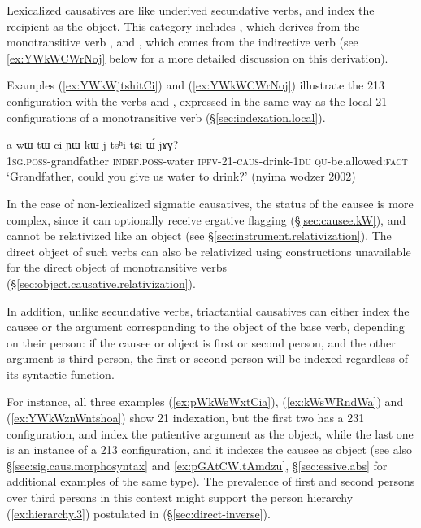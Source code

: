 Lexicalized causatives are like underived secundative verbs, and index the recipient as the object. This category includes , which derives from the monotransitive verb , and , which comes from the indirective verb  (see \ref{ex:YWkWCWrNoj} below for a more detailed discussion on this derivation). 

Examples (\ref{ex:YWkWjtshitCi}) and (\ref{ex:YWkWCWrNoj}) illustrate the 2\fl{}1\fl{}3 configuration with the verbs  and , expressed in the same way as the local 2\fl{}1 configurations of a monotransitive verb (§\ref{sec:indexation.local}).

\begin{exe}
	\ex \label{ex:YWkWjtshitCi}
	\gll a-wɯ tɯ-ci ɲɯ-kɯ-j-tsʰi-tɕi ɯ́-jɤɣ? \\
	\textsc{1sg}.\textsc{poss}-grandfather \textsc{indef}.\textsc{poss}-water \textsc{ipfv}-2\fl{}1-\textsc{caus}-drink-\textsc{1du} \textsc{qu}-be.allowed:\textsc{fact} \\
	\glt `Grandfather, could you give us water to drink?' (nyima wodzer 2002)
\end{exe}

In the case of non-lexicalized sigmatic causatives, the status of the causee is more complex, since it can optionally receive ergative flagging (§\ref{sec:causee.kW}), and cannot be relativized like an object (see §\ref{sec:instrument.relativization}). The direct object of such verbs can also be relativized using constructions unavailable for the direct object of monotransitive verbs (§\ref{sec:object.causative.relativization}).


In addition, unlike secundative verbs, triactantial causatives can either index the causee or the argument corresponding to the object of the base verb, depending on their person: if the causee or object is first or second person, and the other argument is third person, the first or second person will be indexed regardless of its syntactic function. 

For instance, all three examples (\ref{ex:pWkWsWxtCia}), (\ref{ex:kWsWRndWa}) and (\ref{ex:YWkWznWntshoa}) show 2\fl{}1 indexation, but the first two has a 2\fl{}3\fl{}1 configuration, and index the patientive argument as the object, while the last one is an instance of a 2\fl{}1\fl{}3 configuration, and it indexes the causee as object (see also §\ref{sec:sig.caus.morphosyntax} and \ref{ex:pGAtCW.tAmdzu}, §\ref{sec:essive.abs} for additional examples of the same type). The prevalence of first and second persons over third persons in this context might support the person hierarchy (\ref{ex:hierarchy.3}) postulated in (§\ref{sec:direct-inverse}).

